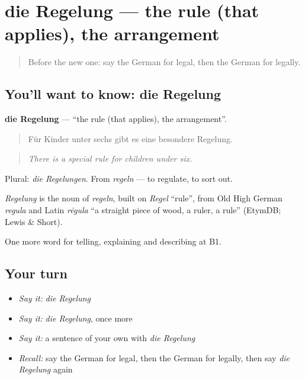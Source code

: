 \section[die Regelung]{die Regelung — the rule (that applies), the arrangement}

\label{lesson:GE-C385-regelung}



\begin{quote}
Before the new one: say the German for legal, then the German for legally.
\end{quote}

\subsection*{You'll want to know: die Regelung}
\textbf{die Regelung} — \textquotedblleft{}the rule (that applies), the arrangement\textquotedblright{}.

\begin{quote}
Für Kinder unter sechs gibt es eine besondere Regelung.
\end{quote}

\begin{quote}
\emph{There is a special rule for children under six.}
\end{quote}

Plural: \emph{die Regelungen}. From \emph{regeln} — to regulate, to sort out.

\begin{cousinweb}
\emph{Regelung} is the noun of \emph{regeln}, built on \emph{Regel} \textquotedblleft{}rule\textquotedblright{}, from Old High German \emph{regula} and Latin \emph{rēgula} \textquotedblleft{}a straight piece of wood, a ruler, a rule\textquotedblright{} (EtymDB; Lewis \& Short).
\end{cousinweb}

\begin{grammarlens}[title={What you've built}]
One more word for telling, explaining and describing at B1.
\end{grammarlens}

\subsection*{Your turn}
\begin{itemize}
\raggedright
  \item \emph{Say it:} \emph{die Regelung}
  \item \emph{Say it:} \emph{die Regelung}, once more
  \item \emph{Say it:} a sentence of your own with \emph{die Regelung}
  \item \emph{Recall:} say the German for legal, then the German for legally, then say \emph{die Regelung} again
\end{itemize}

